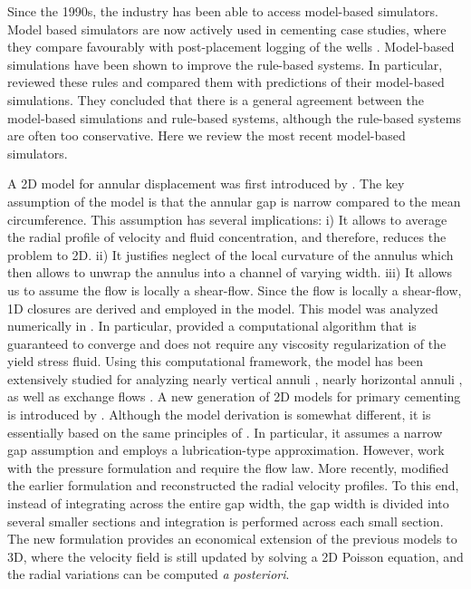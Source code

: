\documentclass[review]{elsarticle}
\begin{document}
Since the 1990s, the industry has been able to access model-based simulators. Model based simulators are now actively used in cementing case studies, where they compare favourably with post-placement logging of the wells \citep{Osayande2004,Bogaerts2015,Gregatti2015,Guo2015}. Model-based simulations have been shown to improve the rule-based systems. In particular, \citet{Pelipenko2004c} reviewed these rules and compared them with predictions of their model-based simulations. They concluded that there is a general agreement between the model-based simulations and rule-based systems, although the rule-based systems are often too conservative. Here we review the most recent model-based simulators.

A 2D model for annular displacement was first introduced by \citet{Bittleston2002}. The key assumption of the model is that the annular gap is narrow compared to the mean circumference. This assumption has several implications: i) It allows to average the radial profile of velocity and fluid concentration, and therefore, reduces the problem to 2D. ii) It justifies neglect of the local curvature of the annulus which then allows to unwrap the annulus into a channel of varying width. iii) It allows us to assume the flow is locally a shear-flow. Since the flow is locally a shear-flow, 1D closures are derived and employed in the model. This model was analyzed numerically in \citet{Pelipenko2004a,Pelipenko2004b}. In particular, \cite{Pelipenko2004b} provided a computational algorithm that is guaranteed to converge and does not require any viscosity regularization of the yield stress fluid. Using this computational framework, the model has been extensively studied for analyzing nearly vertical annuli \citep{Pelipenko2004c}, nearly horizontal annuli \citep{Carrasco2008}, as well as exchange flows \citep{Ngwa2010}. A new generation of 2D models for primary cementing is introduced by \citet{Tardy2015}. Although the model derivation is somewhat different, it is essentially based on the same principles of \citet{Bittleston2002}. In particular, it assumes a narrow gap assumption and employs a lubrication-type approximation.  However, \citet{Tardy2015} work with the pressure formulation and require the flow law. More recently, \citet{Tardy2018} modified the earlier formulation and reconstructed the radial velocity profiles. To this end, instead of integrating across the entire gap width, the gap width is divided into several smaller sections and integration is performed across each small section. The new formulation provides an economical extension of the previous models to 3D, where the velocity field is still updated by solving a 2D Poisson equation, and the radial variations can be computed \textit{a posteriori}. 
\end{document}
